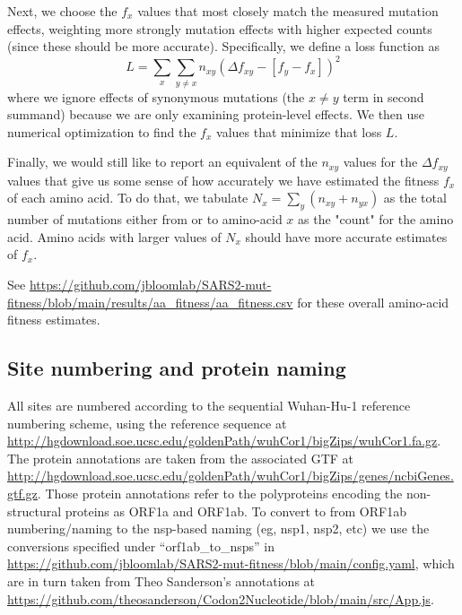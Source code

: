 \documentclass[9pt,twocolumn,twoside]{gsajnl_modified}
\begin{document}
{Next, we choose the $f_x$ values that most closely match the measured mutation effects, weighting more strongly mutation effects with higher expected counts (since these should be more accurate).
Specifically, we define a loss function as
$$
L = \sum_x \sum_{y \ne x} n_{xy} \left(\Delta f_{xy} - \left[f_y - f_x\right]\right)^2
$$
where we ignore effects of synonymous mutations (the $x \ne y$ term in second summand) because we are only examining protein-level effects.
We then use numerical optimization to find the $f_x$ values that minimize that loss $L$.

Finally, we would still like to report an equivalent of the $n_{xy}$ values for the $\Delta f_{xy}$ values that give us some sense of how accurately we have estimated the fitness $f_x$ of each amino acid.
To do that, we tabulate $N_x = \sum_y \left(n_{xy} + n_{yx} \right)$ as the total number of mutations either from or to amino-acid $x$ as the "count" for the amino acid.
Amino acids with larger values of $N_x$ should have more accurate estimates of $f_x$.

See \url{https://github.com/jbloomlab/SARS2-mut-fitness/blob/main/results/aa_fitness/aa_fitness.csv} for these overall amino-acid fitness estimates.

\subsection{Site numbering and protein naming}
All sites are numbered according to the sequential Wuhan-Hu-1 reference numbering scheme, using the reference sequence at \url{http://hgdownload.soe.ucsc.edu/goldenPath/wuhCor1/bigZips/wuhCor1.fa.gz}.
The protein annotations are taken from the associated GTF at \url{http://hgdownload.soe.ucsc.edu/goldenPath/wuhCor1/bigZips/genes/ncbiGenes.gtf.gz}.
Those protein annotations refer to the polyproteins encoding the non-structural proteins as ORF1a and ORF1ab.
To convert to from ORF1ab numbering/naming to the nsp-based naming (eg, nsp1, nsp2, etc) we use the conversions specified under ``orf1ab\_to\_nsps'' in \url{https://github.com/jbloomlab/SARS2-mut-fitness/blob/main/config.yaml}, which are in turn taken from Theo Sanderson's annotations at \url{https://github.com/theosanderson/Codon2Nucleotide/blob/main/src/App.js}.

}
\end{document}
